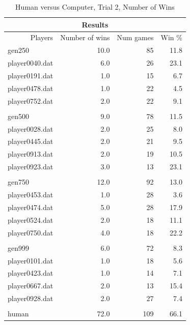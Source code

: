 \begin{table}[htbp]
  \centering
  \caption{Human versus Computer, Trial 2, Number of Wins}
    \begin{tabular}{rrrr}
    \toprule
    \multicolumn{4}{c}{Results} \\
    \midrule
    Players & Number of wins & Num games & Win \% \\
    \multicolumn{1}{l}{gen250}         & 10.0 & 85 & 11.8 \\
    \multicolumn{1}{l}{player0040.dat} & 6.0  & 26 & 23.1 \\
    \multicolumn{1}{l}{player0191.dat} & 1.0  & 15 & 6.7 \\
    \multicolumn{1}{l}{player0478.dat} & 1.0  & 22 & 4.5 \\
    \multicolumn{1}{l}{player0752.dat} & 2.0  & 22 & 9.1 \\ \\
    \multicolumn{1}{l}{gen500}         & 9.0  & 78  & 11.5  \\
    \multicolumn{1}{l}{player0028.dat} & 2.0  & 25  & 8.0  \\
    \multicolumn{1}{l}{player0445.dat} & 2.0  & 21  & 9.5  \\
    \multicolumn{1}{l}{player0913.dat} & 2.0  & 19  & 10.5  \\
    \multicolumn{1}{l}{player0923.dat} & 3.0  & 13  & 23.1  \\ \\
    \multicolumn{1}{l}{gen750}         & 12.0 & 92  & 13.0  \\
    \multicolumn{1}{l}{player0453.dat} & 1.0  & 28  & 3.6  \\
    \multicolumn{1}{l}{player0474.dat} & 5.0  & 28  & 17.9  \\
    \multicolumn{1}{l}{player0524.dat} & 2.0  & 18  & 11.1  \\
    \multicolumn{1}{l}{player0750.dat} & 4.0  & 18  & 22.2  \\ \\
    \multicolumn{1}{l}{gen999}         & 6.0  & 72  & 8.3  \\
    \multicolumn{1}{l}{player0101.dat} & 1.0  & 18  & 5.6  \\
    \multicolumn{1}{l}{player0423.dat} & 1.0  & 14  & 7.1  \\
    \multicolumn{1}{l}{player0667.dat} & 2.0  & 13  & 15.4  \\
    \multicolumn{1}{l}{player0928.dat} & 2.0  & 27  & 7.4  \\ \\
    \multicolumn{1}{l}{human}          & 72.0 & 109 & 66.1  \\
    \bottomrule
    \end{tabular}%
  \label{tab:human_rga_2a}%
\end{table}%

